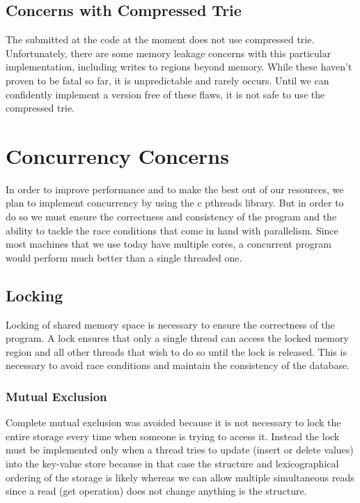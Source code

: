 \documentclass{article}
\begin{document}
\subsection{Concerns with Compressed Trie}

The submitted at the code at the moment does not use compressed trie. Unfortunately, there are some memory leakage concerns with this particular implementation, including writes to regions beyond memory. While these haven't proven to be fatal so far, it is unpredictable and rarely occurs. Until we can confidently implement a version free of these flaws, it is not safe to use the compressed trie.

\section{Concurrency Concerns}
In order to improve performance and to make the best out of our resources, we plan to implement concurrency by using the c pthreads library. But in order to do so we must ensure the correctness and consistency of the program and the ability to tackle the race conditions that come in hand with parallelism. Since most machines that we use today have multiple cores, a concurrent program would perform much better than a single threaded one.

\subsection{Locking}
Locking of shared memory space is necessary to ensure the correctness of the program. A lock ensures that only a single thread can access the locked memory region and all other threads that wish to do so until the lock is released. This is necessary to avoid race conditions and maintain the consistency of the database. 

\subsubsection{Mutual Exclusion}
Complete mutual exclusion was avoided because it is not necessary to lock the entire storage every time when someone is trying to access it. Instead the lock must be implemented only when a thread tries to update (insert or delete values) into the key-value store because in that case the structure and lexicographical ordering of the storage is likely whereas we can allow multiple simultaneous reads since a read (get operation) does not change anything is the structure. 
\end{document}
